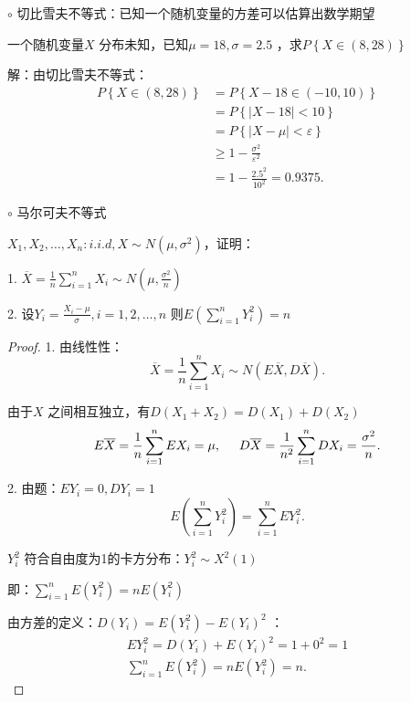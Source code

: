 $\circ$ 切比雪夫不等式：已知一个随机变量的方差可以估算出数学期望
\begin{question}
    一个随机变量$X$ 分布未知，已知$\mu=18,\sigma=2.5$ ，求$P\left\{ X\in (8,28) \right\} $
\end{question}
解：由切比雪夫不等式：
\begin{align*}
    P\left\{ X\in (8,28) \right\} &= P\left\{ X-18\in (-10,10) \right\}  \\
    &= P\left\{ \left| X-18 \right| <10 \right\}  \\
    &= P\left\{ \left| X-\mu \right| <\varepsilon \right\}  \\
    &\ge 1-\frac{\sigma^2}{\varepsilon^2} \\
    &= 1-\frac{2.5^2}{10^2} =0.9375 
.\end{align*}

$\circ$ 马尔可夫不等式

\begin{eg}
    $X_1,X_2,\ldots,X_n: i.i.d,X\sim N\left( \mu,\sigma^2 \right) $，证明：

    1. $\overline{X}=\displaystyle{\frac{1}{n} \sum_{i=1}^{n}X_i\sim N\left( \mu,\frac{\sigma^2}{n}  \right) }$

    2. 设$Y_i=\displaystyle{\frac{X_i-\mu}{\sigma}} ,i=1,2,\ldots,n$ 则$E\left( \displaystyle{\sum_{i=1}^{n}} Y_i^2 \right) =n$
\end{eg}
\begin{proof}
    1. 由线性性：\[
        \overline{X}=\frac{1}{n} \sum_{i=1}^{n} X_i\sim N\left( E\overline{X},D\overline{X} \right) 
    .\] 

    由于$X$ 之间相互独立，有$D\left( X_1+X_2 \right) =D\left( X_1 \right) +D\left( X_2 \right) $
    \[
        E\overline{X}=\frac{1}{n} \sum_{i=1}^{n} EX_i=\mu, \hspace{0.5cm} D\overline{X}=\frac{1}{n^2} \sum_{i=1}^{n} DX_i=\frac{\sigma^2}{n} 
    .\] 

    2. 由题：$EY_i=0,DY_i=1$ 
    \[
        E\left( \sum_{i=1}^{n} Y_i^2 \right) =\sum_{i=1}^{n} EY_i^2
    .\] 
    \begin{notation}
        $Y_i^2$ 符合自由度为1的卡方分布：$Y_i^2\sim X^2\left( 1 \right) $
    \end{notation}
    
    即：$\displaystyle{\sum_{i=1}^{n} E\left( Y_i^2 \right) =nE\left( Y_i^2 \right) }$

    由方差的定义：$D\left( Y_i \right) =E\left( Y_i^2 \right) -E\left( Y_i \right) ^2$ ：
\begin{align*}
    EY_i^2=D\left( Y_i \right) +E\left( Y_i \right) ^2=1+0^2=1\\
    \sum_{i=1}^{n} E\left( Y_i^2 \right) =nE\left( Y_i^2 \right) =n
.\end{align*}
\end{proof}

